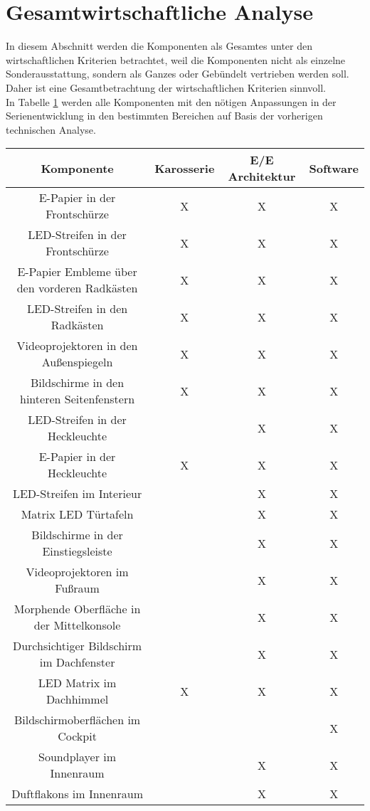 \section{Gesamtwirtschaftliche Analyse}
In diesem Abschnitt werden die Komponenten als Gesamtes unter den wirtschaftlichen Kriterien betrachtet, weil die Komponenten nicht als einzelne Sonderausstattung, sondern als Ganzes oder Gebündelt vertrieben werden soll. Daher ist eine Gesamtbetrachtung der wirtschaftlichen Kriterien sinnvoll. \\
In Tabelle \ref{tab:Entwicklung} werden alle Komponenten mit den nötigen Anpassungen in der Serienentwicklung in den bestimmten Bereichen auf Basis der vorherigen technischen Analyse. 
\begin{table}[hbt]	
	\centering
	\renewcommand{\arraystretch}{1.5}	%
	\label{tab:Entwicklung}
	\begin{tabular}{c|ccc}
		\textbf{Komponente} & \textbf{Karosserie} & \textbf{E/E Architektur} & \textbf{Software} \\ 
		\hline 
		\hline 
		E-Papier in der Frontschürze & X & X & X \\
		LED-Streifen in der Frontschürze & X & X & X \\
		E-Papier Embleme über den vorderen Radkästen & X & X & X \\
		LED-Streifen in den Radkästen & X & X & X \\
		Videoprojektoren in den Außenspiegeln & X & X & X \\
		Bildschirme in den hinteren Seitenfenstern & X & X & X \\
		LED-Streifen in der Heckleuchte &  & X & X \\
		E-Papier in der Heckleuchte & X & X & X \\
		LED-Streifen im Interieur &  & X & X \\
		Matrix LED Türtafeln &  & X & X \\
		Bildschirme in der Einstiegsleiste &  & X & X \\
		Videoprojektoren im Fußraum &  & X & X \\
		Morphende Oberfläche in der Mittelkonsole &  & X & X \\
		Durchsichtiger Bildschirm im Dachfenster &  & X & X \\
		LED Matrix im Dachhimmel & X & X & X \\
		Bildschirmoberflächen im Cockpit &  &  & X \\
		Soundplayer im Innenraum &  & X & X \\
		Duftflakons im Innenraum &  & X & X \\
	\end{tabular} 
\end{table}


